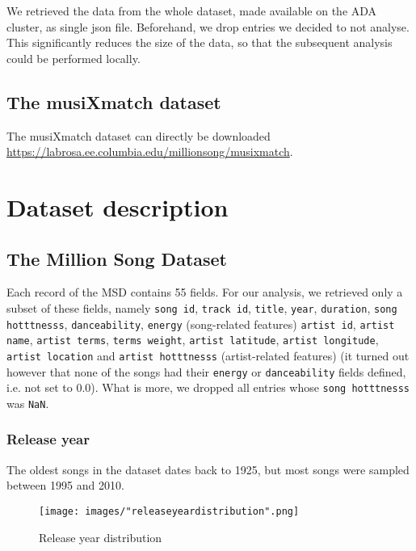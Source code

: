 \documentclass[11pt]{article}
\renewcommand\_{\textunderscore\allowbreak}
\begin{document}
We retrieved the data from the whole dataset, made available on the ADA cluster, as single json file. Beforehand, we drop entries we decided to not analyse. 
This significantly reduces the size of the data, so that the subsequent analysis could be performed locally.

\subsection{The musiXmatch dataset}
The musiXmatch dataset can directly be downloaded  \url{https://labrosa.ee.columbia.edu/millionsong/musixmatch}.

\section{Dataset description}
\subsection{The Million Song Dataset}
Each record of the MSD contains 55 fields.
For our analysis, we retrieved only a subset of these fields, namely \texttt{song id}, \texttt{track id}, \texttt{title}, \texttt{year}, \texttt{duration}, \texttt{song hotttnesss}, \texttt{danceability}, \texttt{energy} (song-related features) \texttt{artist id}, \texttt{artist name}, \texttt{artist terms}, \texttt{terms weight}, \texttt{artist latitude},  \texttt{artist longitude}, \texttt{artist location} and \texttt{artist hotttnesss} (artist-related features) 
(it turned out however that none of the songs had their \texttt{energy} or \texttt{danceability} fields defined, i.e. not set to 0.0).
What is more, we dropped all entries whose \texttt{song hotttnesss} was \texttt{NaN}.

\subsubsection{Release year}
The oldest songs in the dataset dates back to 1925, but most songs were sampled between 1995 and 2010.

\begin{figure}[h!]
\centering
\captionsetup{width=1.0\textwidth}
\texttt{[image: images/"release\_year\_distribution".png]}
\caption{Release year distribution}
\label{fig:song_duration}
\end{figure}
\end{document}
